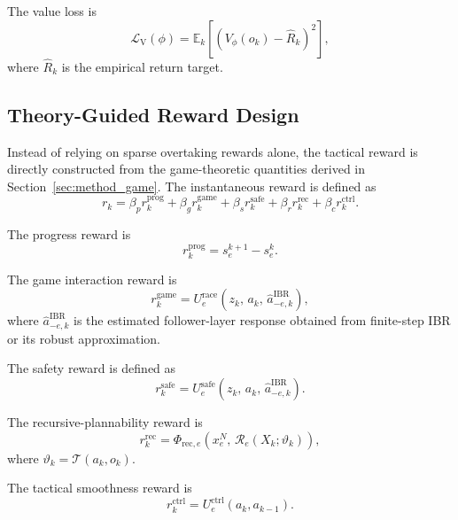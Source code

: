 \documentclass[final ,3p, times]{elsarticle}
\begin{document}
The value loss is
\begin{equation}
\mathcal{L}_{\mathrm{V}}(\phi)
=
\mathbb{E}_k
\left[
\left(
V_\phi(o_k)-\hat R_k
\right)^2
\right],
\label{eq:value_loss}
\end{equation}
where $\hat R_k$ is the empirical return target.

\subsection{Theory-Guided Reward Design}
\label{subsec:theory_guided_reward}

Instead of relying on sparse overtaking rewards alone, the tactical reward is directly constructed from the game-theoretic quantities derived in Section~\ref{sec:method_game}. The instantaneous reward is defined as
\begin{equation}
r_k
=
\beta_p r_k^{\mathrm{prog}}
+
\beta_g r_k^{\mathrm{game}}
+
\beta_s r_k^{\mathrm{safe}}
+
\beta_r r_k^{\mathrm{rec}}
+
\beta_c r_k^{\mathrm{ctrl}}.
\label{eq:total_reward}
\end{equation}

The progress reward is
\begin{equation}
r_k^{\mathrm{prog}} = s_e^{k+1}-s_e^k.
\label{eq:progress_reward}
\end{equation}

The game interaction reward is
\begin{equation}
r_k^{\mathrm{game}}
=
U_e^{\mathrm{race}}
\left(
z_k,\,
a_k,\,
\hat a_{-e,k}^{\mathrm{IBR}}
\right),
\label{eq:game_reward}
\end{equation}
where $\hat a_{-e,k}^{\mathrm{IBR}}$ is the estimated follower-layer response obtained from finite-step IBR or its robust approximation.

The safety reward is defined as
\begin{equation}
r_k^{\mathrm{safe}}
=
U_e^{\mathrm{safe}}
\left(
z_k,\,
a_k,\,
\hat a_{-e,k}^{\mathrm{IBR}}
\right).
\label{eq:safety_reward}
\end{equation}

The recursive-plannability reward is
\begin{equation}
r_k^{\mathrm{rec}}
=
\Phi_{\mathrm{rec},e}
\left(
x_e^{N},\,
\mathcal{R}_e(X_k;\vartheta_k)
\right),
\label{eq:recursive_reward}
\end{equation}
where $\vartheta_k=\mathcal{T}(a_k,o_k)$.

The tactical smoothness reward is
\begin{equation}
r_k^{\mathrm{ctrl}}
=
U_e^{\mathrm{ctrl}}(a_k,a_{k-1}).
\label{eq:control_reward}
\end{equation}
\end{document}
